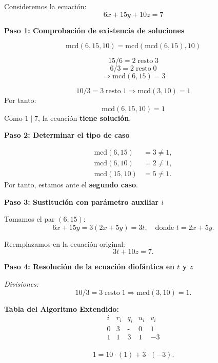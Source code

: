\documentclass[a4paper,12pt]{article}
\begin{document}
\begin{ejemplo}[title={Ecuación diofántica con 3 incógnitas (Segundo caso)}]
Consideremos la ecuación:
\[
6x + 15y + 10z = 7
\]

\textbf{Paso 1: Comprobación de existencia de soluciones}

\[
\text{mcd}(6,15,10) = \text{mcd}(\text{mcd}(6,15),10)
\]

\[
15 / 6 = 2 \;\text{resto}\; \boxed{3}
\]
\[
6 / 3 = 2 \;\text{resto}\; 0
\]
\[
\Rightarrow \text{mcd}(6,15) = 3
\]

\[
10 / 3 = 3 \;\text{resto}\; \boxed{1} \Rightarrow \text{mcd}(3,10) = 1
\]
Por tanto:
\[
\text{mcd}(6,15,10) = 1
\]
Como \(1 \mid 7\), la ecuación \textbf{tiene solución}.

\bigskip

\textbf{Paso 2: Determinar el tipo de caso}

\[
\begin{aligned}
\text{mcd}(6,15) &= 3 \neq 1,\\
\text{mcd}(6,10) &= 2 \neq 1,\\
\text{mcd}(15,10) &= 5 \neq 1.
\end{aligned}
\]
Por tanto, estamos ante el \textbf{segundo caso}.

\bigskip

\textbf{Paso 3: Sustitución con parámetro auxiliar \(t\)}

Tomamos el par \((6,15)\):
\[
6x + 15y = 3(2x + 5y) = 3t, \quad \text{donde } t = 2x + 5y.
\]

Reemplazamos en la ecuación original:
\[
3t + 10z = 7.
\]

\bigskip

\textbf{Paso 4: Resolución de la ecuación diofántica en \(t\) y \(z\)}

\textit{Divisiones:}
\[
10 / 3 = 3 \;\text{resto}\; \boxed{1}
\Rightarrow \text{mcd}(3,10) = \boxed{1}.
\]

\textbf{Tabla del Algoritmo Extendido:}
\[
\begin{array}{c|c|c|c|c}
i & r_i & q_i & u_i & v_i \\
\hline
0 & 3 & \text{-} & 0 & 1 \\
1 & \boxed{1} & 3 & 1 & -3 \\
\end{array}
\]

\[
\boxed{1} = 10 \cdot (1) + 3 \cdot (-3).
\]

\end{ejemplo}
\end{document}
